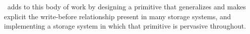 \Kudos\ adds to this body of work by designing a primitive that
generalizes and makes explicit the write-before relationship
present in many storage systems, and implementing a storage system in which
that primitive is pervasive throughout.
